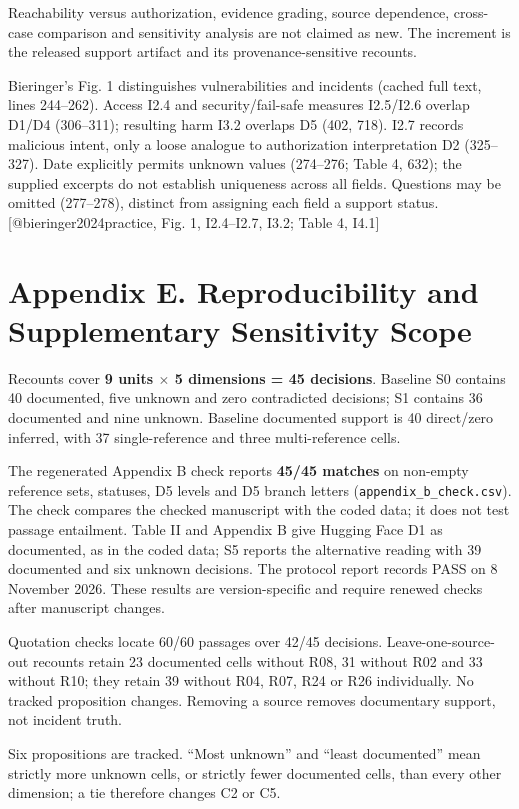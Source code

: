 \documentclass[conference]{IEEEtran}
\begin{document}
Reachability versus authorization, evidence grading, source dependence, cross-case comparison and sensitivity analysis are not claimed as new. The increment is the released support artifact and its provenance-sensitive recounts.

Bieringer's Fig. 1 distinguishes vulnerabilities and incidents (cached full text, lines 244--262). Access I2.4 and security/fail-safe measures I2.5/I2.6 overlap D1/D4 (306--311); resulting harm I3.2 overlaps D5 (402, 718). I2.7 records malicious intent, only a loose analogue to authorization interpretation D2 (325--327). Date explicitly permits unknown values (274--276; Table 4, 632); the supplied excerpts do not establish uniqueness across all fields. Questions may be omitted (277--278), distinct from assigning each field a support status. [@bieringer2024practice, Fig. 1, I2.4--I2.7, I3.2; Table 4, I4.1]

\section*{Appendix E. Reproducibility and Supplementary Sensitivity Scope}

Recounts cover \textbf{9 units $\times $ 5 dimensions = 45 decisions}. Baseline S0 contains 40 documented, five unknown and zero contradicted decisions; S1 contains 36 documented and nine unknown. Baseline documented support is 40 direct/zero inferred, with 37 single-reference and three multi-reference cells.

The regenerated Appendix B check reports \textbf{45/45 matches} on non-empty reference sets, statuses, D5 levels and D5 branch letters (\texttt{appendix\_b\_check.csv}). The check compares the checked manuscript with the coded data; it does not test passage entailment. Table II and Appendix B give Hugging Face D1 as documented, as in the coded data; S5 reports the alternative reading with 39 documented and six unknown decisions. The protocol report records PASS on 8 November 2026. These results are version-specific and require renewed checks after manuscript changes.

Quotation checks locate 60/60 passages over 42/45 decisions. Leave-one-source-out recounts retain 23 documented cells without R08, 31 without R02 and 33 without R10; they retain 39 without R04, R07, R24 or R26 individually. No tracked proposition changes. Removing a source removes documentary support, not incident truth.

Six propositions are tracked. ``Most unknown'' and ``least documented'' mean strictly more unknown cells, or strictly fewer documented cells, than every other dimension; a tie therefore changes C2 or C5.
\end{document}

